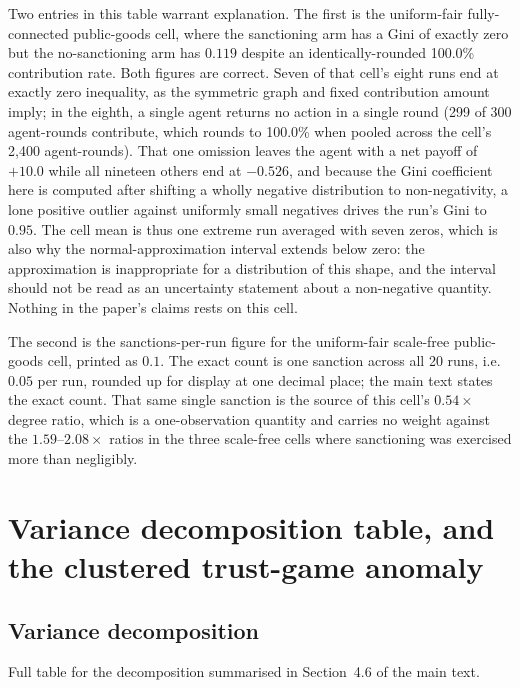 \documentclass[11pt,a4paper]{article}
\begin{document}
Two entries in this table warrant explanation. The first is the
uniform-fair fully-connected public-goods cell, where the sanctioning
arm has a Gini of exactly zero but the no-sanctioning arm has
$0.119$ despite an identically-rounded 100.0\% contribution rate. Both
figures are correct. Seven of that cell's eight runs end at exactly
zero inequality, as the symmetric graph and fixed contribution amount
imply; in the eighth, a single agent returns no action in a single
round (299 of 300 agent-rounds contribute, which rounds to 100.0\%
when pooled across the cell's 2,400 agent-rounds). That one omission
leaves the agent with a net payoff of $+10.0$ while all nineteen
others end at $-0.526$, and because the Gini coefficient here is
computed after shifting a wholly negative distribution to
non-negativity, a lone positive outlier against uniformly small
negatives drives the run's Gini to $0.95$. The cell mean is thus one
extreme run averaged with seven zeros, which is also why the
normal-approximation interval extends below zero: the approximation
is inappropriate for a distribution of this shape, and the interval
should not be read as an uncertainty statement about a
non-negative quantity. Nothing in the paper's claims rests on this
cell.

The second is the sanctions-per-run figure for the uniform-fair
scale-free public-goods cell, printed as $0.1$. The exact count is one
sanction across all 20 runs, i.e.\ $0.05$ per run, rounded up for
display at one decimal place; the main text states the exact count.
That same single sanction is the source of this cell's $0.54\times$
degree ratio, which is a one-observation quantity and carries no
weight against the $1.59$--$2.08\times$ ratios in the three
scale-free cells where sanctioning was exercised more than
negligibly.

\section{Variance decomposition table, and the clustered trust-game anomaly}
\label{sec:s10}

\subsection{Variance decomposition}
\label{sec:s10-1}

Full table for the decomposition summarised in Section~4.6 of the main
text.
\end{document}
